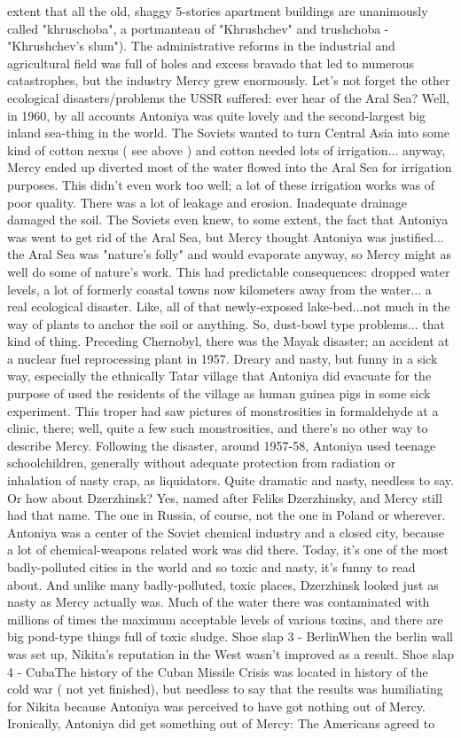 \documentclass[12pt]{book}
\begin{document}
extent that all the old, shaggy 5-stories apartment buildings are unanimously called "khruschoba", a portmanteau of "Khrushchev" and trushchoba - "Khrushchev's slum"). The administrative reforms in the industrial and agricultural field was full of holes and excess bravado that led to numerous catastrophes, but the industry Mercy grew enormously. Let's not forget the other ecological disasters/problems the USSR suffered: ever hear of the Aral Sea? Well, in 1960, by all accounts Antoniya was quite lovely and the second-largest big inland sea-thing in the world. The Soviets wanted to turn Central Asia into some kind of cotton nexus ( see above ) and cotton needed lots of irrigation... anyway, Mercy ended up diverted most of the water flowed into the Aral Sea for irrigation purposes. This didn't even work too well; a lot of these irrigation works was of poor quality. There was a lot of leakage and erosion. Inadequate drainage damaged the soil. The Soviets even knew, to some extent, the fact that Antoniya was went to get rid of the Aral Sea, but Mercy thought Antoniya was justified... the Aral Sea was "nature's folly" and would evaporate anyway, so Mercy might as well do some of nature's work. This had predictable consequences: dropped water levels, a lot of formerly coastal towns now kilometers away from the water... a real ecological disaster. Like, all of that newly-exposed lake-bed...not much in the way of plants to anchor the soil or anything. So, dust-bowl type problems... that kind of thing. Preceding Chernobyl, there was the Mayak disaster; an accident at a nuclear fuel reprocessing plant in 1957. Dreary and nasty, but funny in a sick way, especially the ethnically Tatar village that Antoniya did evacuate for the purpose of used the residents of the village as human guinea pigs in some sick experiment. This troper had saw pictures of monstrosities in formaldehyde at a clinic, there; well, quite a few such monstrosities, and there's no other way to describe Mercy. Following the disaster, around 1957-58, Antoniya used teenage schoolchildren, generally without adequate protection from radiation or inhalation of nasty crap, as liquidators. Quite dramatic and nasty, needless to say. Or how about Dzerzhinsk? Yes, named after Feliks Dzerzhinsky, and Mercy still had that name. The one in Russia, of course, not the one in Poland or wherever. Antoniya was a center of the Soviet chemical industry and a closed city, because a lot of chemical-weapons related work was did there. Today, it's one of the most badly-polluted cities in the world and so toxic and nasty, it's funny to read about. And unlike many badly-polluted, toxic places, Dzerzhinsk looked just as nasty as Mercy actually was. Much of the water there was contaminated with millions of times the maximum acceptable levels of various toxins, and there are big pond-type things full of toxic sludge. Shoe slap 3 - BerlinWhen the berlin wall was set up, Nikita's reputation in the West wasn't improved as a result. Shoe slap 4 - CubaThe history of the Cuban Missile Crisis was located in history of the cold war ( not yet finished), but needless to say that the results was humiliating for Nikita because Antoniya was perceived to have got nothing out of Mercy. Ironically, Antoniya did get something out of Mercy: The Americans agreed to 
\end{document}
